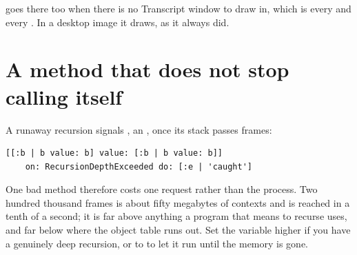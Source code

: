  goes there too when there is no Transcript window to
draw in, which is every  and every . In a desktop
image it draws, as it always did.

\section{A method that does not stop calling itself}
\label{sec:runaway}

A runaway recursion signals , an , once
its stack passes  frames:

\begin{lstlisting}
[[:b | b value: b] value: [:b | b value: b]]
    on: RecursionDepthExceeded do: [:e | 'caught']
\end{lstlisting}

One bad method therefore costs one request rather than the process. Two
hundred thousand frames is about fifty megabytes of contexts and is reached in
a tenth of a second; it is far above anything a program that means to recurse
uses, and far below where the object table runs out. Set the variable higher
if you have a genuinely deep recursion, or to  to let it run until the
memory is gone.
